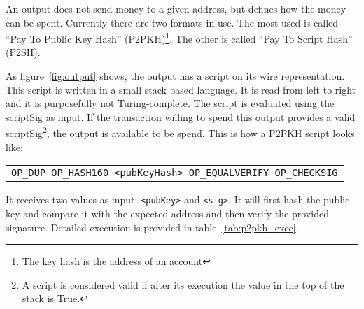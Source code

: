 An output does not send money to a given address, but defines how the money can
  be spent. Currently there are two formats in use. The most used is called
  ``Pay To Public Key Hash'' (P2PKH)\footnote{The key hash is the address of an
  account}. The other is called ``Pay To Script Hash'' (P2SH).

As figure~\ref{fig:output} shows, the output has a script on its wire
  representation.
This script is written in a small stack based language.
It is read from left to right and it is purposefully not Turing-complete.
The script is evaluated using the scriptSig as input. If the transaction willing
  to spend this output provides a valid scriptSig\footnote{A script is
  considered valid if after its execution the value in the top of the stack is
  True.}, the output is available to be spend. This is how a P2PKH script looks
  like:

\begin{center}
  \begin{tabular}{|c|}
    \texttt{OP\_DUP OP\_HASH160 <pubKeyHash> OP\_EQUALVERIFY OP\_CHECKSIG}
  \end{tabular}
\end{center}

It receives two values as input:  \lstinline{<pubKey>} and \lstinline{<sig>}.
It will first hash the public key and compare it with the expected address and
  then verify the provided signature.
Detailed execution is provided in table~\ref{tab:p2pkh_exec}.

